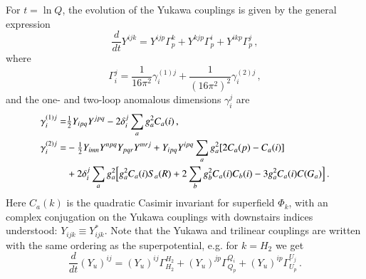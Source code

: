 \documentclass[final,3p,times,pdflatex]{elsarticle}
\newcommand{\dt}{\frac{d}{dt}}
\begin{document}
For $t = \ln Q$, the evolution of the Yukawa couplings is given by the general expression
%
\begin{equation}
\dt Y^{ijk} = Y^{ijp}\Gamma_p^k + Y^{kjp}\Gamma_p^i + Y^{ikp}\Gamma_p^j\,,
\end{equation}
%
where 
%
\begin{equation}
\Gamma_i^j = \frac{1}{16\pi^2}\gamma_i^{(1)j} 
+ \frac{1}{(16\pi^2)^2}\gamma_{i}^{(2)j}\,,
\end{equation}
%
and the one- and two-loop anomalous dimensions $\gamma_i^j$ are
%
\begin{align}
\gamma_i^{(1)j} =& \tfrac{1}{2}Y_{ipq}Y^{jpq} - 2\delta_i^j \sum_a g_a^2C_a(i)\,, \\
%
\gamma_i^{(2)j} =& -\tfrac{1}{2}Y_{imn}Y^{npq}Y_{pqr}Y^{mrj} 
+ Y_{ipq}Y^{ipq} \sum_a g_a^2[2C_a(p) - C_a(i)] \notag \\
%
&+ 2\delta_i^j \sum_a g_a^2 
\Big[g_a^2C_a(i)S_a(R) +2\sum_b g_b^2C_a(i)C_b(i) - 3g_a^2C_a(i)C(G_a)\Big]\,.
\end{align}
%
Here $C_a(k)$ is the quadratic Casimir invariant for superfield $\Phi_k$, with 
an complex conjugation on the Yukawa couplings with downstairs indices 
understood: $Y_{ijk} \equiv Y_{ijk}^*$.  Note that the Yukawa and trilinear 
couplings are written with the same ordering as the superpotential, e.g. for 
$k = H_2$ we get
%
\begin{equation}
\dt (Y_u)^{ij} = (Y_u)^{ij}\Gamma^{H_2}_{H_2} + (Y_u)^{jp}\Gamma_{Q_p}^{Q_i} + (Y_u)^{ip}\Gamma_{U_p}^{U_j}\,.
\end{equation}
\end{document}
